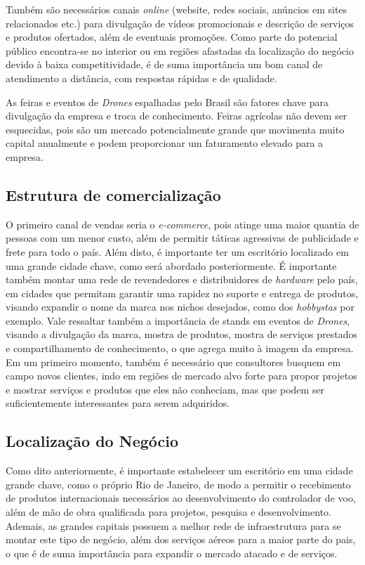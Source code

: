 Também são necessários canais \emph{online} (website, redes sociais, 
anúncios em sites relacionados etc.) para divulgação de vídeos 
promocionais e descrição de serviços e produtos ofertados, além de 
eventuais promoções. Como parte do potencial público encontra-se no 
interior ou em regiões afastadas da localização do negócio devido à baixa 
competitividade, é de suma importância um bom canal de atendimento a 
distância, com respostas rápidas e de qualidade. 

As feiras e eventos de \emph{Drones} espalhadas pelo Brasil são fatores chave para 
divulgação da empresa e troca de conhecimento. Feiras agrícolas não devem 
ser esquecidas, pois são um mercado potencialmente grande que movimenta 
muito capital anualmente e podem proporcionar um faturamento elevado para a empresa. 

\subsection{Estrutura de comercialização}


O primeiro canal de vendas seria o \emph{e-commerce}, pois atinge uma maior 
quantia de pessoas com um menor custo, além de permitir táticas agressivas 
de publicidade e frete para todo o país. Além disto, é importante ter um 
escritório localizado em uma grande cidade chave, como será abordado 
posteriormente. É importante também montar uma rede de revendedores e 
distribuidores de \emph{hardware} pelo país, em cidades que permitam 
garantir uma rapidez no suporte e entrega de produtos, visando expandir o 
nome da marca nos nichos desejados, como dos \emph{hobbystas} por exemplo. 
Vale ressaltar também a importância de stands em eventos de \emph{Drones}, visando 
a divulgação da marca, mostra de produtos, mostra de serviços prestados e 
compartilhamento de conhecimento, o que agrega muito à imagem da empresa.
Em um primeiro momento, também é necessário que consultores busquem em campo 
novos clientes, indo em regiões de mercado alvo forte para propor projetos e 
mostrar serviços e produtos que eles não conheciam, mas que podem ser 
suficientemente interessantes para serem adquiridos.

\subsection{Localização do Negócio}


Como dito anteriormente, é importante estabelecer um escritório em uma cidade 
grande chave, como o próprio Rio de Janeiro, de modo a permitir o recebimento de 
produtos internacionais necessários ao desenvolvimento do controlador de voo, 
além de mão de obra qualificada para projetos, pesquisa e desenvolvimento. 
Ademais, as grandes capitais possuem a melhor rede de infraestrutura para se 
montar este tipo de negócio, além dos serviços aéreos para a maior parte do 
pais, o que é de suma importância para expandir o mercado atacado e de serviços.
